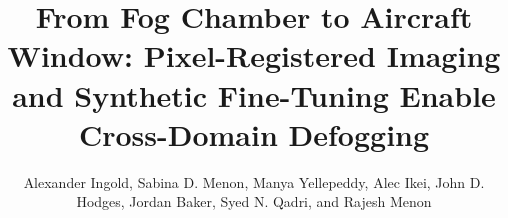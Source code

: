 \documentclass{optica-article}
\begin{document}
\title{From Fog Chamber to Aircraft Window: Pixel-Registered Imaging and Synthetic Fine-Tuning Enable Cross-Domain Defogging}

\author{Alexander Ingold, Sabina D. Menon, Manya Yellepeddy, Alec Ikei, John D. Hodges, Jordan Baker, Syed N. Qadri, and Rajesh Menon}

\address{ Department of Electrical and Computer Engineering, University of Utah, Salt Lake City, UT 84112, USA\\
 U.S. Naval Research Laboratory Remote Sensing Division, Washington DC 20375, USA.\\}


\end{document}
